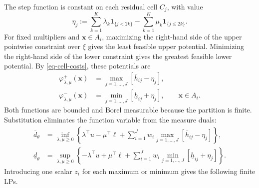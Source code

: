 \documentclass[review,11pt,3p,authoryear,nopreprintline]{elsarticle}
\begin{document}
The step function is constant on each residual cell $C_j$, with value
\begin{equation}
  \eta_j:=\sum_{k=1}^K\lambda_k\mathbf1_{\{j<2k\}}
  -\sum_{k=1}^K\mu_k\mathbf1_{\{j\le2k\}}.
  \label{eq-dual-cell-values}
\end{equation}
For fixed multipliers and $\bm x\in A_i$, maximizing the right-hand side of the upper pointwise constraint over $\xi$ gives the least feasible upper potential. Minimizing the right-hand side of the lower constraint gives the greatest feasible lower potential. By \eqref{eq-cell-costs}, these potentials are
\begin{equation}
  \begin{aligned}
    \varphi^+_{\lambda,\mu}(\bm x)
    &=\max_{j=1,\ldots,J}\left[\overline h_{ij}-\eta_j\right],\\
    \varphi^-_{\lambda,\mu}(\bm x)
    &=\min_{j=1,\ldots,J}\left[\underline h_{ij}+\eta_j\right],
    \qquad\bm x\in A_i.
  \end{aligned}
  \label{eq-optimal-cell-potentials}
\end{equation}
Both functions are bounded and Borel measurable because the partition is finite. Substitution eliminates the function variable from the measure duals:
\begin{align}
  \overline d_\theta
  &=\inf_{\lambda,\mu\ge0}
  \left\{\lambda^\top u-\mu^\top\ell
  +\sum_{i=1}^Jw_i\max_{j=1,\ldots,J}\left[\overline h_{ij}-\eta_j\right]\right\},
  \label{eq-reduced-upper-dual}\\
  \underline d_\theta
  &=\sup_{\lambda,\mu\ge0}
  \left\{-\lambda^\top u+\mu^\top\ell
  +\sum_{i=1}^Jw_i\min_{j=1,\ldots,J}\left[\underline h_{ij}+\eta_j\right]\right\}.
  \label{eq-reduced-lower-dual}
\end{align}
Introducing one scalar $z_i$ for each maximum or minimum gives the following finite LPs.
\end{document}
